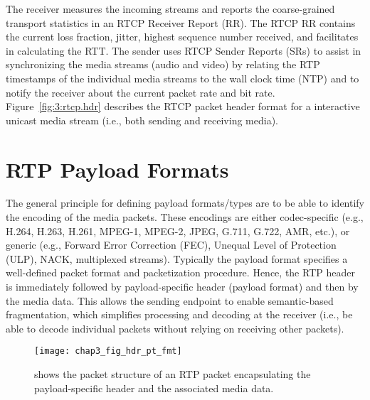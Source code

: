 
The receiver measures the incoming streams and reports the coarse-grained
transport statistics in an RTCP Receiver Report (RR). The RTCP RR contains the
current loss fraction, jitter, highest sequence number received, and
facilitates in calculating the RTT. The sender uses RTCP Sender Reports (SRs)
to assist in synchronizing the media streams (audio and video) by relating the
RTP timestamps of the individual media streams to the wall clock time (NTP)
and to notify the receiver about the current packet rate and bit rate.
Figure~\ref{fig:3:rtcp.hdr} describes the RTCP packet header format for a
interactive unicast media stream (i.e., both sending and receiving media).

\section{RTP Payload Formats}

The general principle for defining payload formats/types are to be able to
identify the encoding of the media packets. These encodings are either
codec-specific (e.g., H.264, H.263, H.261, MPEG-1, MPEG-2, JPEG, G.711, G.722,
AMR, etc.), or generic (e.g., Forward Error Correction (FEC), Unequal Level of
Protection (ULP), NACK, multiplexed streams). Typically the payload format
specifies a well-defined packet format and packetization procedure. Hence, the
RTP header is immediately followed by payload-specific header (payload format)
and then by the media data. This allows the sending endpoint to enable
semantic-based fragmentation, which simplifies processing and decoding at the
receiver (i.e., be able to decode individual packets without relying on
receiving other packets).

\begin{figure}[!h]
\centerline{\texttt{[image: chap3\_fig\_hdr\_pt\_fmt]}}
\caption{shows the packet structure of an RTP packet encapsulating the
payload-specific header and the associated media data.}
\label{fig:3:pt.fmt}
\end{figure}

